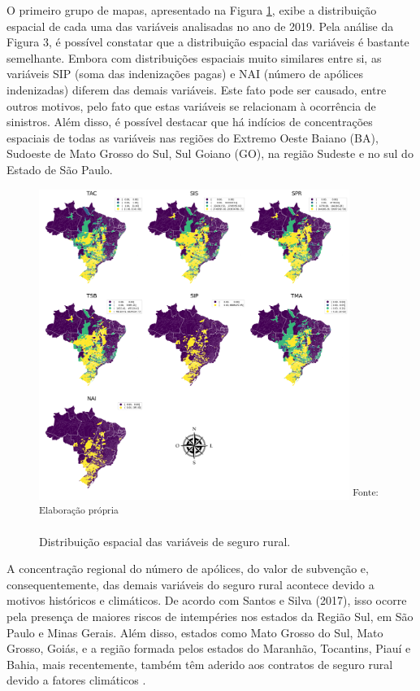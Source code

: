 \documentclass[
	12pt,				%
	openright,			%
	oneside,			%
	a4paper,			%
	chapter=TITLE,		%
	section=TITLE,		%
	english,			%
	french,				%
	spanish,			%
	brazil				%
	]{abntex2}
\begin{document}
O primeiro grupo de mapas, apresentado na Figura \ref{mapa_variaveis}, exibe a distribuição espacial de cada uma das variáveis analisadas no ano de 2019. Pela análise da Figura 3, é possível constatar que a distribuição espacial das variáveis é bastante semelhante. Embora com distribuições espaciais muito similares entre si, as variáveis SIP (soma das indenizações pagas) e NAI (número de apólices indenizadas) diferem das demais variáveis. Este fato pode ser causado, entre outros motivos, pelo fato que estas variáveis se relacionam à ocorrência de sinistros. Além disso, é possível destacar que há indícios de concentrações espaciais de todas as variáveis nas regiões do Extremo Oeste Baiano (BA), Sudoeste de Mato Grosso do Sul, Sul Goiano (GO), na região Sudeste e no sul do Estado de São Paulo. 

\begin{figure}[h]
	\centering
	\caption{Distribuição espacial das variáveis de seguro rural.}
	\includegraphics[width=0.9\textwidth]{img/map_variaveis.png}
	\noindent \small \textsuperscript{Fonte: Elaboração própria}
	\label{mapa_variaveis}
\end{figure}

A concentração regional do número de apólices, do valor de subvenção e, consequentemente, das demais variáveis do seguro rural acontece devido a motivos históricos e climáticos. De acordo com Santos e Silva (2017), isso ocorre pela presença de maiores riscos de intempéries nos estados da Região Sul, em São Paulo e Minas Gerais. Além disso, estados como Mato Grosso do Sul, Mato Grosso, Goiás, e a região formada pelos estados do Maranhão, Tocantins, Piauí e Bahia, mais recentemente, também têm aderido aos contratos de seguro rural devido a fatores climáticos \cite{santos17}. 
\end{document}
